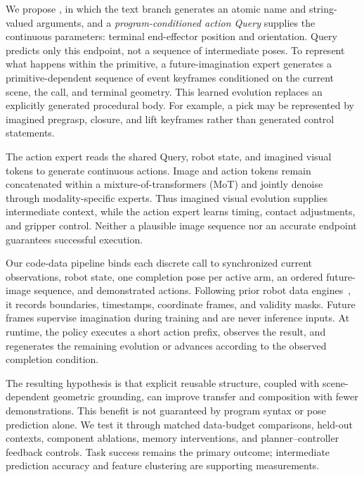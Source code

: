 We propose \model{}, in which the text branch generates an atomic name and string-valued arguments, and a \emph{program-conditioned action Query} supplies the continuous parameters: terminal end-effector position and orientation. Query predicts only this endpoint, not a sequence of intermediate poses. To represent what happens within the primitive, a future-imagination expert generates a primitive-dependent sequence of event keyframes conditioned on the current scene, the call, and terminal geometry. This learned evolution replaces an explicitly generated procedural body. For example, a pick may be represented by imagined pregrasp, closure, and lift keyframes rather than generated control statements.

The action expert reads the shared Query, robot state, and imagined visual tokens to generate continuous actions. Image and action tokens remain concatenated within a mixture-of-transformers (MoT) and jointly denoise through modality-specific experts. Thus imagined visual evolution supplies intermediate context, while the action expert learns timing, contact adjustments, and gripper control. Neither a plausible image sequence nor an accurate endpoint guarantees successful execution.

Our code-data pipeline binds each discrete call to synchronized current observations, robot state, one completion pose per active arm, an ordered future-image sequence, and demonstrated actions. Following prior robot data engines~\cite{robomimic,mimicgen,oxembodiment}, it records boundaries, timestamps, coordinate frames, and validity masks. Future frames supervise imagination during training and are never inference inputs. At runtime, the policy executes a short action prefix, observes the result, and regenerates the remaining evolution or advances according to the observed completion condition.

The resulting hypothesis is that explicit reusable structure, coupled with scene-dependent geometric grounding, can improve transfer and composition with fewer demonstrations. This benefit is not guaranteed by program syntax or pose prediction alone. We test it through matched data-budget comparisons, held-out contexts, component ablations, memory interventions, and planner--controller feedback controls. Task success remains the primary outcome; intermediate prediction accuracy and feature clustering are supporting measurements.

